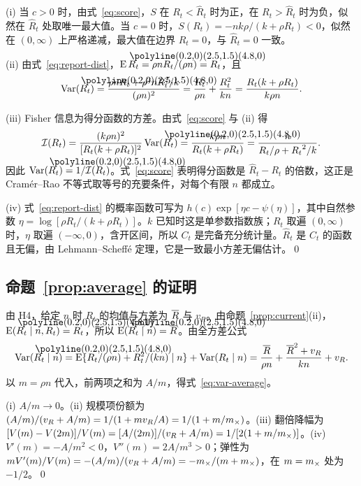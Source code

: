 (i) 当 $c>0$ 时，由式~\eqref{eq:score}，$S$ 在 $R_t<\widehat R_t$ 时为正，在 $R_t>\widehat R_t$ 时为负，似然在 $\widehat R_t$ 处取唯一最大值。当 $c=0$ 时，$S(R_t)=-nk\rho/(k+\rho R_t)<0$，似然在 $(0,\infty)$ 上严格递减，最大值在边界 $R_t=0$，与 $\widehat R_t=0$ 一致。

(ii) 由式~\eqref{eq:report-dist}，$\E\widehat R_t=\rho nR_t/(\rho n)=R_t$，且
\begin{equation*}
  \Var(\widehat R_t)=\frac{\rho nR_t+\rho^2nR_t^2/k}{(\rho n)^2}=\frac{R_t}{\rho n}+\frac{R_t^2}{kn}=\frac{R_t(k+\rho R_t)}{k\rho n}.
\end{equation*}

(iii) Fisher 信息为得分函数的方差。由式~\eqref{eq:score} 与 (ii) 得
\begin{equation*}
  \mathcal I(R_t)=\frac{(k\rho n)^2}{[R_t(k+\rho R_t)]^2}\Var(\widehat R_t)=\frac{k\rho n}{R_t(k+\rho R_t)}=\frac{n}{R_t/\rho+{R_t}^2/k}.
\end{equation*}
因此 $\Var(\widehat R_t)=1/\mathcal I(R_t)$。式~\eqref{eq:score} 表明得分函数是 $\widehat R_t-R_t$ 的倍数，这正是 Cramér--Rao 不等式取等号的充要条件，对每个有限 $n$ 都成立。

(iv) 式~\eqref{eq:report-dist} 的概率函数可写为 $h(c)\exp[\eta c-\psi(\eta)]$，其中自然参数 $\eta=\log[\rho R_t/(k+\rho R_t)]$。$k$ 已知时这是单参数指数族；$R_t$ 取遍 $(0,\infty)$ 时，$\eta$ 取遍 $(-\infty,0)$，含开区间，所以 $C_t$ 是完备充分统计量。$\widehat R_t$ 是 $C_t$ 的函数且无偏，由 Lehmann--Scheffé 定理，它是一致最小方差无偏估计\citep{lehmann1998point}。\qed

\subsection{\texorpdfstring{命题~\ref{prop:average} 的证明}{命题 2 的证明}}

由 H4，给定 $n$ 时 $R_t$ 的均值与方差为 $\overline{R}$ 与 $v_R$。由命题~\ref{prop:current}(ii)，$\E(\widehat R_t\mid n,R_t)=R_t$，所以 $\E(\widehat R_t\mid n)=\Rbar$。由全方差公式
\begin{equation*}
  \Var(\widehat R_t\mid n)=\E\{R_t/(\rho n)+R_t^2/(kn)\mid n\}+\Var(R_t\mid n)
  =\frac{\Rbar}{\rho n}+\frac{\Rbar^2+v_R}{kn}+v_R.
\end{equation*}
以 $m=\rho n$ 代入，前两项之和为 $A/m$，得式~\eqref{eq:var-average}。

(i) $A/m\to0$。(ii) 规模项份额为 $(A/m)/(v_R+A/m)=1/(1+mv_R/A)=1/(1+m/m_{\times})$。(iii) 翻倍降幅为 $[V(m)-V(2m)]/V(m)=[A/(2m)]/(v_R+A/m)=1/[2(1+m/m_{\times})]$。(iv) $V'(m)=-A/m^2<0$，$V''(m)=2A/m^3>0$；弹性为 $mV'(m)/V(m)=-(A/m)/(v_R+A/m)=-m_{\times}/(m+m_{\times})$，在 $m=m_{\times}$ 处为 $-1/2$。\qed

